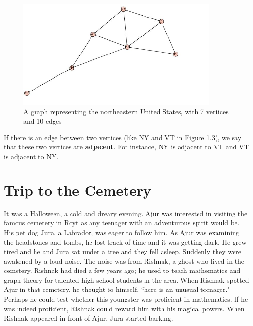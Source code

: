 \begin{figure}
\includegraphics[width=0.9\textwidth]{example3.JPG}
\caption{A graph representing the northeastern United States, with 7 vertices and 10 edges}
\end{figure}
\begin{newpage}
\end{newpage}

If there is an edge between two vertices (like NY and VT in Figure 1.3), we say that these two vertices are \textbf{adjacent}. For instance, NY is adjacent to VT and VT is adjacent to NY.

   

\chapter{Trip to the Cemetery}
It was a Halloween, a cold and dreary evening. Ajur was interested in visiting the famous cemetery in Royt as any teenager with an adventurous spirit would be. His pet dog Jura, a Labrador, was eager to follow him. As Ajur was examining the headstones and tombs, he lost track of time and it was getting dark. He grew tired and he and Jura sat under a tree and they fell asleep. Suddenly they were awakened by a loud noise. The noise was from Rishnak, a ghost who lived in the cemetery. Rishnak had died a few years ago; he used to teach mathematics and graph theory for talented high school students in the area. When Rishnak spotted Ajur in that cemetery, he thought to himself, ``here is an unusual teenager." Perhaps he could test whether this youngster  was proficient in mathematics. If he was indeed proficient, Rishnak could reward him with his magical powers. When Rishnak appeared in front of Ajur, Jura started barking.  

